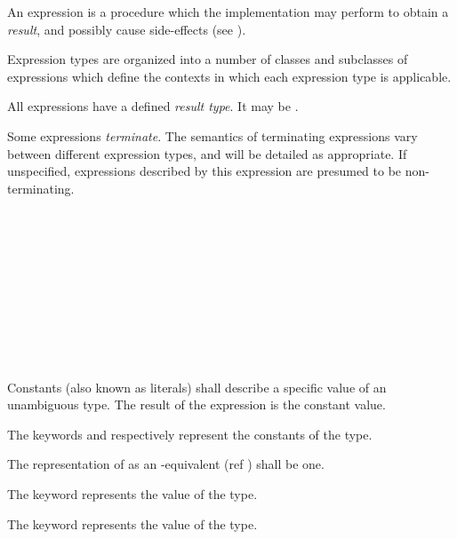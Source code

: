 
\specsubitem
An expression is a procedure which the implementation may perform to obtain a
\textit{result}, and possibly cause side-effects (see
).

\specsubitem
Expression types are organized into a number of classes and subclasses of
expressions which define the contexts in which each expression type is
applicable.

\specsubitem
All expressions have a defined \textit{result type}. It may be .

\specsubitem
Some expressions \textit{terminate}. The semantics of terminating expressions
vary between different expression types, and will be detailed as appropriate.
If unspecified, expressions described by this expression are presumed to be
non-terminating.


\begin{grammar}
 \\
	 \\
	 \\
	 \\
	 \\
	 \\
	 \\
	 \\
	 \\
\end{grammar}

\specsubsubitem
Constants (also known as literals) shall describe a specific value of an
unambiguous type. The result of the expression is the constant value.

\specsubsubitem
The keywords  and  respectively represent
the constants of the  type.

\specsubsubitem
The representation of  as an -equivalent (ref
) shall be one.

\specsubsubitem
The  keyword represents the  value of the
 type.

\specsubsubitem
The  keyword represents the  value of the
 type.

